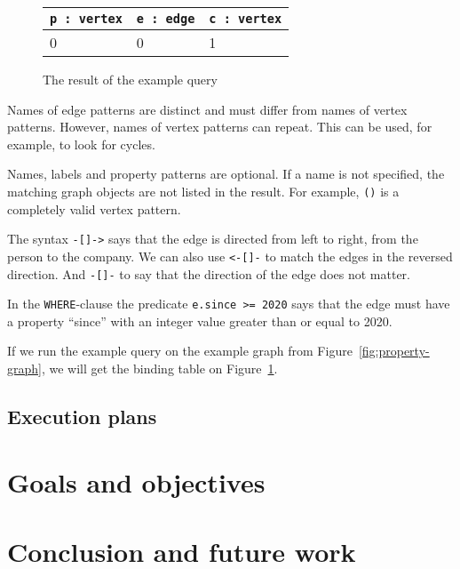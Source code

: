 \documentclass[14pt]{constructor-thesis}
\begin{document}
\begin{figure}[b]
  \centering
  
  \begin{tabular}{ |p{3cm}|p{3cm}|p{3cm}|  }
    \hline
    \texttt{p : vertex} & \texttt{e : edge} & \texttt{c : vertex} \\
    \hline
    0 & 0 & 1 \\
    \hline
  \end{tabular}

  \caption{The result of the example query}
  \label{fig:example-query-binding-table}
\end{figure}

Names of edge patterns are distinct and must differ from names of vertex patterns. However, names of vertex patterns can repeat. This can be used, for example, to look for cycles.

Names, labels and property patterns are optional. If a name is not specified, the matching graph objects are not listed in the result. For example, \texttt{()} is a completely valid vertex pattern.

The syntax \texttt{-[]->} says that the edge is directed from left to right, from the person to the company. We can also use \texttt{<-[]-} to match the edges in the reversed direction. And \texttt{-[]-} to say that the direction of the edge does not matter.

In the \texttt{WHERE}-clause the predicate \verb+e.since >= 2020+ says that the edge must have a property ``since'' with an integer value greater than or equal to 2020.

If we run the example query on the example graph from Figure~\ref{fig:property-graph}, we will get the binding table on Figure~\ref{fig:example-query-binding-table}.

\subsection{Execution plans}

\section{Goals and objectives}


\section*{Conclusion and future work}

\setmonofont[Mapping=tex-text]{CMU Typewriter Text}
% 
% 
\printbibliography
\end{document}
